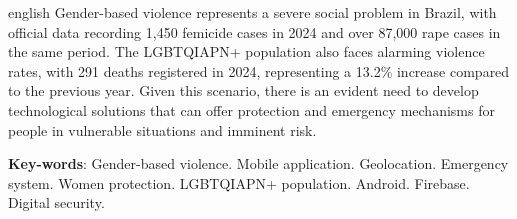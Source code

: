 \documentclass[
	12pt,				    %
	openright,			    %
	oneside,			    %
	a4paper,			    %
    sumario=tradicional,    %
	english,			    %
	brazil,				    %
	]{abntex2}              %
\begin{document}
\begin{resumo}[Abstract]
 \begin{otherlanguage*}{english}
   \noindent
Gender-based violence represents a severe social problem in Brazil, with official data recording 1,450 femicide cases in 2024 and over 87,000 rape cases in the same period. The LGBTQIAPN+ population also faces alarming violence rates, with 291 deaths registered in 2024, representing a 13.2\% increase compared to the previous year. Given this scenario, there is an evident need to develop technological solutions that can offer protection and emergency mechanisms for people in vulnerable situations and imminent risk.

   \vspace{\onelineskip}

   \noindent
   \textbf{Key-words}: Gender-based violence. Mobile application. Geolocation. Emergency system. Women protection. LGBTQIAPN+ population. Android. Firebase. Digital security.
 \end{otherlanguage*}
\end{resumo}

\listoffigures*
\cleardoublepage








\tableofcontents*
\cleardoublepage
\end{document}
